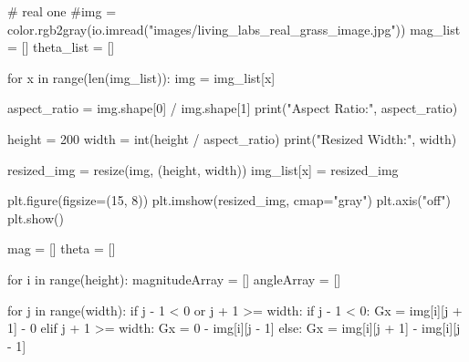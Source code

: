 \documentclass[
  letterpaper,
  DIV=11,
  numbers=noendperiod]{scrreprt}
\newenvironment{Shaded}{\begin{snugshade}}{\end{snugshade}}
\newcommand{\BuiltInTok}[1]{\textcolor[rgb]{0.00,0.23,0.31}{#1}}
\newcommand{\CommentTok}[1]{\textcolor[rgb]{0.37,0.37,0.37}{#1}}
\newcommand{\ControlFlowTok}[1]{\textcolor[rgb]{0.00,0.23,0.31}{#1}}
\newcommand{\DecValTok}[1]{\textcolor[rgb]{0.68,0.00,0.00}{#1}}
\newcommand{\KeywordTok}[1]{\textcolor[rgb]{0.00,0.23,0.31}{#1}}
\newcommand{\NormalTok}[1]{\textcolor[rgb]{0.00,0.23,0.31}{#1}}
\newcommand{\OperatorTok}[1]{\textcolor[rgb]{0.37,0.37,0.37}{#1}}
\newcommand{\StringTok}[1]{\textcolor[rgb]{0.13,0.47,0.30}{#1}}
\begin{document}
\begin{Shaded}
\begin{Highlighting}[]
\CommentTok{\# real one}
\CommentTok{\#img = color.rgb2gray(io.imread("images/living\_labs\_real\_grass\_image.jpg"))}
\NormalTok{mag\_list }\OperatorTok{=}\NormalTok{ []}
\NormalTok{theta\_list }\OperatorTok{=}\NormalTok{ []}


\ControlFlowTok{for}\NormalTok{ x }\KeywordTok{in} \BuiltInTok{range}\NormalTok{(}\BuiltInTok{len}\NormalTok{(img\_list)):}
\NormalTok{    img }\OperatorTok{=}\NormalTok{ img\_list[x]}
    
\NormalTok{    aspect\_ratio }\OperatorTok{=}\NormalTok{ img.shape[}\DecValTok{0}\NormalTok{] }\OperatorTok{/}\NormalTok{ img.shape[}\DecValTok{1}\NormalTok{]}
    \BuiltInTok{print}\NormalTok{(}\StringTok{"Aspect Ratio:"}\NormalTok{, aspect\_ratio)}
    
\NormalTok{    height }\OperatorTok{=} \DecValTok{200}
\NormalTok{    width }\OperatorTok{=} \BuiltInTok{int}\NormalTok{(height }\OperatorTok{/}\NormalTok{ aspect\_ratio)}
    \BuiltInTok{print}\NormalTok{(}\StringTok{"Resized Width:"}\NormalTok{, width)}
    
\NormalTok{    resized\_img }\OperatorTok{=}\NormalTok{ resize(img, (height, width))}
\NormalTok{    img\_list[x] }\OperatorTok{=}\NormalTok{ resized\_img}
    
\NormalTok{    plt.figure(figsize}\OperatorTok{=}\NormalTok{(}\DecValTok{15}\NormalTok{, }\DecValTok{8}\NormalTok{))}
\NormalTok{    plt.imshow(resized\_img, cmap}\OperatorTok{=}\StringTok{"gray"}\NormalTok{)}
\NormalTok{    plt.axis(}\StringTok{"off"}\NormalTok{)}
\NormalTok{    plt.show()}
    
\NormalTok{    mag }\OperatorTok{=}\NormalTok{ []}
\NormalTok{    theta }\OperatorTok{=}\NormalTok{ []}
    
    \ControlFlowTok{for}\NormalTok{ i }\KeywordTok{in} \BuiltInTok{range}\NormalTok{(height):}
\NormalTok{        magnitudeArray }\OperatorTok{=}\NormalTok{ []}
\NormalTok{        angleArray }\OperatorTok{=}\NormalTok{ []}
        
        \ControlFlowTok{for}\NormalTok{ j }\KeywordTok{in} \BuiltInTok{range}\NormalTok{(width):}
            \ControlFlowTok{if}\NormalTok{ j }\OperatorTok{{-}} \DecValTok{1} \OperatorTok{\textless{}} \DecValTok{0} \KeywordTok{or}\NormalTok{ j }\OperatorTok{+} \DecValTok{1} \OperatorTok{\textgreater{}=}\NormalTok{ width:}
                \ControlFlowTok{if}\NormalTok{ j }\OperatorTok{{-}} \DecValTok{1} \OperatorTok{\textless{}} \DecValTok{0}\NormalTok{:}
\NormalTok{                    Gx }\OperatorTok{=}\NormalTok{ img[i][j }\OperatorTok{+} \DecValTok{1}\NormalTok{] }\OperatorTok{{-}} \DecValTok{0}
                \ControlFlowTok{elif}\NormalTok{ j }\OperatorTok{+} \DecValTok{1} \OperatorTok{\textgreater{}=}\NormalTok{ width:}
\NormalTok{                    Gx }\OperatorTok{=} \DecValTok{0} \OperatorTok{{-}}\NormalTok{ img[i][j }\OperatorTok{{-}} \DecValTok{1}\NormalTok{]}
            \ControlFlowTok{else}\NormalTok{:}
\NormalTok{                Gx }\OperatorTok{=}\NormalTok{ img[i][j }\OperatorTok{+} \DecValTok{1}\NormalTok{] }\OperatorTok{{-}}\NormalTok{ img[i][j }\OperatorTok{{-}} \DecValTok{1}\NormalTok{]}
                

\end{Highlighting}
\end{Shaded}
\end{document}
